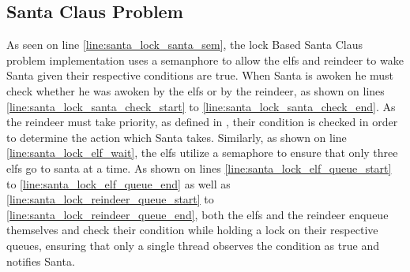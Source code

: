 \subsection{Santa Claus Problem}
As seen on line \ref{line:santa_lock_santa_sem}, the lock Based Santa Claus problem implementation uses a semanphore to allow the elfs and reindeer to wake Santa given their respective conditions are true. When Santa is awoken he must check whether he was awoken by the elfs or by the reindeer, as shown on lines \ref{line:santa_lock_santa_check_start} to \ref{line:santa_lock_santa_check_end}. As the reindeer must take priority, as defined in , their condition is checked in order to determine the action which Santa takes. Similarly, as shown on line \ref{line:santa_lock_elf_wait}, the elfs utilize a semaphore to ensure that only three elfs go to santa at a time. As shown on lines \ref{line:santa_lock_elf_queue_start} to \ref{line:santa_lock_elf_queue_end} as well as \ref{line:santa_lock_reindeer_queue_start} to \ref{line:santa_lock_reindeer_queue_end}, both the elfs and the reindeer enqueue themselves and check their condition while holding a lock on their respective queues, ensuring that only a single thread observes the condition as true and notifies Santa.

